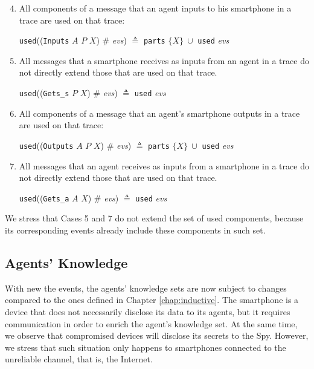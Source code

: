 \begin{enumerate}
  \setcounter{enumi}{3}
  \item All components of a message that an agent inputs to his smartphone in a trace are used on that trace:
  \begin{center}
    \texttt{used}((\texttt{Inputs} $A$ $P$ $X$) $\#$ \textit{evs}) $\triangleq$ \texttt{parts} $\{ X\}\ \cup$ \texttt{used} \textit{evs}
  \end{center}

  \item All messages that a smartphone receives as inputs from an agent in a trace do not directly extend those that are used on that trace.
  \begin{center}
    \texttt{used}((\texttt{Gets\_s} $P$ $X$) $\#$ \textit{evs}) $\triangleq$ \texttt{used} \textit{evs}
  \end{center}

  \item All components of a message that an agent's smartphone outputs in a trace are used on that trace:
  \begin{center}
    \texttt{used}((\texttt{Outputs} $A$ $P$ $X$) $\#$ \textit{evs}) $\triangleq$ \texttt{parts} $\{ X\}\ \cup$ \texttt{used} \textit{evs}
  \end{center}

  \item All messages that an agent receives as inputs from a smartphone in a trace do not directly extend those that are used on that trace.
  \begin{center}
    \texttt{used}((\texttt{Gets\_a} $A$ $X$) $\#$ \textit{evs}) $\triangleq$ \texttt{used} \textit{evs}
  \end{center}
\end{enumerate}

\noindent We stress that Cases 5 and 7 do not extend the set of used components, because its corresponding events already include these components in such set.



\subsection{Agents' Knowledge}
\label{ssec:agents-knowledge-smartphone}
With new the events, the agents' knowledge sets are now subject to changes compared to the ones defined in Chapter \ref{chap:inductive}. The smartphone is a device that does not necessarily disclose its data to its agents, but it requires communication in order to enrich the agent's knowledge set. At the same time, we observe that compromised devices will disclose its secrets to the Spy. However, we stress that such situation only happens to smartphones connected to the unreliable channel, that is, the Internet.

